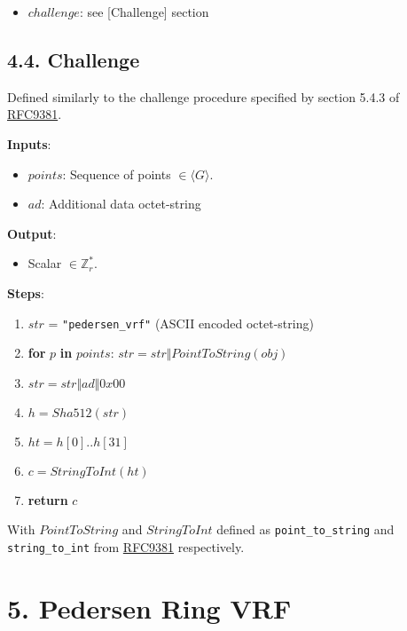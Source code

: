 \documentclass[
]{article}
\providecommand{\tightlist}{%
  \setlength{\itemsep}{0pt}\setlength{\parskip}{0pt}}
\begin{document}
\begin{itemize}
\tightlist
\item
  \(challenge\): see {[}Challenge{]} section
\end{itemize}

\hypertarget{challenge}{%
\subsection{4.4. Challenge}\label{challenge}}

Defined similarly to the challenge procedure specified by section 5.4.3
of \href{https://datatracker.ietf.org/doc/rfc9381}{RFC9381}.

\textbf{Inputs}:

\begin{itemize}
\tightlist
\item
  \(points\): Sequence of points \(\in \langle G \rangle\).
\item
  \(ad\): Additional data octet-string
\end{itemize}

\textbf{Output}:

\begin{itemize}
\tightlist
\item
  Scalar \(\in \mathbb{Z}^*_r\).
\end{itemize}

\textbf{Steps}:

\begin{enumerate}
\def\labelenumi{\arabic{enumi}.}
\tightlist
\item
  \(str\) = \texttt{"pedersen\_vrf"} (ASCII encoded octet-string)
\item
  \textbf{for} \(p\) \textbf{in} \(points\):
  \(str = str \Vert PointToString(obj)\)
\item
  \(str = str \Vert ad \Vert 0x00\)
\item
  \(h = Sha512(str)\)
\item
  \(ht = h[0] .. h[31]\)
\item
  \(c = StringToInt(ht)\)
\item
  \textbf{return} \(c\)
\end{enumerate}

With \(PointToString\) and \(StringToInt\) defined as
\texttt{point\_to\_string} and \texttt{string\_to\_int} from
\href{https://datatracker.ietf.org/doc/rfc9381}{RFC9381} respectively.

\hypertarget{pedersen-ring-vrf}{%
\section{5. Pedersen Ring VRF}\label{pedersen-ring-vrf}}
\end{document}
